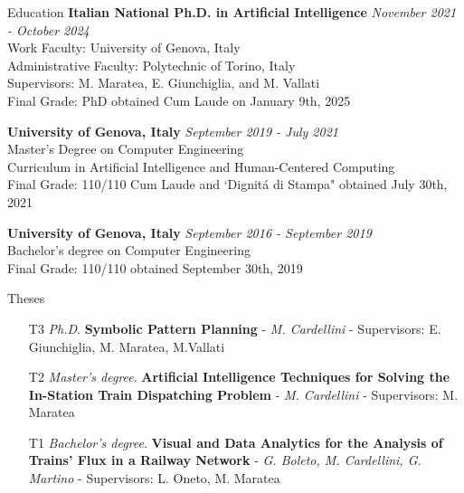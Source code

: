 \documentclass{resume} %
\begin{document}
\begin{rSection}{Education}
{\bf  Italian National Ph.D. in Artificial Intelligence} \hfill {\em November 2021 - \textit{October 2024}} \\ 
Work Faculty: University of Genova, Italy\\
Administrative Faculty: Polytechnic of Torino, Italy\\
Supervisors: M. Maratea, E. Giunchiglia, and M. Vallati\\
Final Grade: PhD obtained Cum Laude on January 9th, 2025

{\bf University of Genova, Italy} \hfill {\em September 2019 - July 2021} \\ 
Master's Degree on Computer Engineering \\
Curriculum in Artificial Intelligence and Human-Centered Computing \\
Final Grade: 110/110 Cum Laude and `Dignit\'a di Stampa" obtained July 30th, 2021

{\bf University of Genova, Italy} \hfill {\em September 2016 - September 2019} \\ 
Bachelor's degree on Computer Engineering \\
Final Grade: 110/110 obtained September 30th, 2019
\end{rSection}
\begin{rSection}{Theses}

\begin{enumerate}[leftmargin=5mm]
\item[T3] \textit{Ph.D}. \textbf{Symbolic Pattern Planning} - \textit{M. Cardellini} - Supervisors: E. Giunchiglia, M. Maratea, M.Vallati
\item[T2] \textit{Master's degree}. \textbf{Artificial Intelligence Techniques for Solving the In-Station
Train Dispatching Problem} - \textit{M. Cardellini} - Supervisors: M. Maratea
\item[T1] \textit{Bachelor's degree}. \textbf{Visual and Data Analytics for the Analysis of Trains' Flux in a Railway Network} - \textit{G. Boleto, M. Cardellini, G. Martino} - Supervisors: L. Oneto, M. Maratea
\end{enumerate}
\end{rSection}
\end{document}
